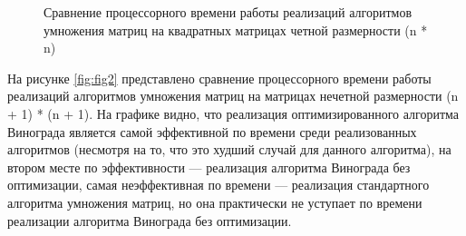\begin{figure}[h!]
	
	
	\caption{Сравнение процессорного времени работы реализаций алгоритмов умножения матриц на квадратных матрицах четной размерности (n * n)}
	
	\label{fig:fig1}
	
\end{figure}


На рисунке \ref{fig:fig2} представлено сравнение процессорного времени работы реализаций алгоритмов умножения матриц на матрицах нечетной размерности (n + 1) * (n + 1). 
На графике видно, что реализация оптимизированного алгоритма Винограда является самой эффективной по времени среди реализованных алгоритмов (несмотря на то, что это худший случай для данного алгоритма), на втором месте по эффективности --- реализация алгоритма Винограда без оптимизации, самая неэффективная по времени --- реализация стандартного алгоритма умножения матриц, но она практически не уступает по времени реализации алгоритма Винограда без оптимизации.

